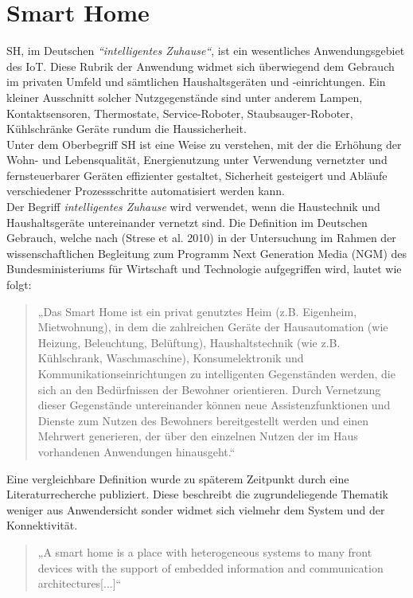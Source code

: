 \section{Smart Home}
\label{sec:smartHome}
    \acl{SH}, im Deutschen \textit{“intelligentes Zuhause“}, ist ein wesentliches Anwendungsgebiet des \acs{IoT}. 
    Diese Rubrik der Anwendung widmet sich überwiegend dem Gebrauch im privaten Umfeld und sämtlichen Haushaltsgeräten 
    und -einrichtungen. Ein kleiner Ausschnitt solcher Nutzgegenstände sind unter anderem Lampen, Kontaktsensoren, 
    Thermostate, Service-Roboter, Staubsauger-Roboter, Kühlschränke Geräte rundum die Haussicherheit. 
    \\ 
    Unter dem Oberbegriff \acl{SH} ist eine Weise zu verstehen, mit der die Erhöhung der Wohn- und Lebensqualität, 
    Energienutzung unter Verwendung vernetzter und fernsteuerbarer Geräten effizienter gestaltet, Sicherheit gesteigert 
    und Abläufe verschiedener Prozessschritte automatisiert werden kann.
    \\ 
    Der Begriff \textit{intelligentes Zuhause} wird verwendet, wenn die Haustechnik und Haushaltsgeräte untereinander 
    vernetzt sind. Die Definition im Deutschen Gebrauch, welche nach (Strese et al. 2010) in der Untersuchung im Rahmen 
    der wissenschaftlichen Begleitung zum Programm Next Generation Media (NGM) des Bundesministeriums für Wirtschaft und 
    Technologie aufgegriffen wird, lautet wie folgt: 
    \begin{quote}
        „Das Smart Home ist ein privat genutztes Heim (z.B. Eigenheim, Mietwohnung), in dem die zahlreichen Geräte der 
        Hausautomation (wie Heizung, Beleuchtung, Belüftung), Haushaltstechnik (wie z.B. Kühlschrank, Waschmaschine), 
        Konsumelektronik und Kommunikationseinrichtungen zu intelligenten Gegenständen werden, die sich an den 
        Bedürfnissen der Bewohner orientieren. Durch Vernetzung dieser Gegenstände untereinander können neue 
        Assistenzfunktionen und Dienste zum Nutzen des Bewohners bereitgestellt werden und einen Mehrwert 
        generieren, der über den einzelnen Nutzen der im Haus vorhandenen Anwendungen hinausgeht.“ \cite{strese.2010m}
    \end{quote}
    Eine vergleichbare Definition wurde zu späterem Zeitpunkt durch eine Literaturrecherche publiziert. Diese beschreibt 
    die zugrundeliegende Thematik weniger aus Anwendersicht sonder widmet sich vielmehr dem System und der Konnektivität. 
    \begin{quote}
        „A smart home is a place with heterogeneous systems to many
        front devices with the support of embedded information and
        communication architectures[...]“ \cite{Balakrishnan2018}
    \end{quote}
